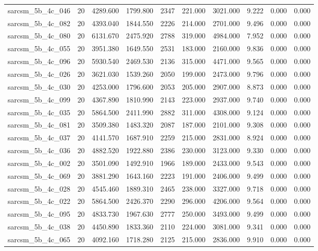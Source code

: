 \begin{tabular}{lrrrrrrrrr}
sarcsm\_5b\_4c\_046 & 20 & 4289.600 & 1799.800 & 2347 & 221.000 & 3021.000 & 9.222 & 0.000 & 0.000 \\
sarcsm\_5b\_4c\_082 & 20 & 4393.040 & 1844.550 & 2226 & 214.000 & 2701.000 & 9.496 & 0.000 & 0.000 \\
sarcsm\_5b\_4c\_080 & 20 & 6131.670 & 2475.920 & 2788 & 319.000 & 4984.000 & 7.952 & 0.000 & 0.000 \\
sarcsm\_5b\_4c\_055 & 20 & 3951.380 & 1649.550 & 2531 & 183.000 & 2160.000 & 9.836 & 0.000 & 0.000 \\
sarcsm\_5b\_4c\_096 & 20 & 5930.540 & 2469.530 & 2136 & 315.000 & 4471.000 & 9.565 & 0.000 & 0.000 \\
sarcsm\_5b\_4c\_026 & 20 & 3621.030 & 1539.260 & 2050 & 199.000 & 2473.000 & 9.796 & 0.000 & 0.000 \\
sarcsm\_5b\_4c\_030 & 20 & 4253.000 & 1796.600 & 2053 & 205.000 & 2907.000 & 8.873 & 0.000 & 0.000 \\
sarcsm\_5b\_4c\_099 & 20 & 4367.890 & 1810.990 & 2143 & 223.000 & 2937.000 & 9.740 & 0.000 & 0.000 \\
sarcsm\_5b\_4c\_035 & 20 & 5864.500 & 2411.990 & 2882 & 311.000 & 4308.000 & 9.124 & 0.000 & 0.000 \\
sarcsm\_5b\_4c\_081 & 20 & 3509.380 & 1483.320 & 2087 & 187.000 & 2101.000 & 9.308 & 0.000 & 0.000 \\
sarcsm\_5b\_4c\_037 & 20 & 4141.570 & 1687.910 & 2259 & 215.000 & 2831.000 & 8.924 & 0.000 & 0.000 \\
sarcsm\_5b\_4c\_036 & 20 & 4882.520 & 1922.880 & 2386 & 230.000 & 3123.000 & 9.330 & 0.000 & 0.000 \\
sarcsm\_5b\_4c\_002 & 20 & 3501.090 & 1492.910 & 1966 & 189.000 & 2433.000 & 9.543 & 0.000 & 0.000 \\
sarcsm\_5b\_4c\_069 & 20 & 3881.290 & 1643.160 & 2223 & 191.000 & 2406.000 & 9.499 & 0.000 & 0.000 \\
sarcsm\_5b\_4c\_028 & 20 & 4545.460 & 1889.310 & 2465 & 238.000 & 3327.000 & 9.718 & 0.000 & 0.000 \\
sarcsm\_5b\_4c\_022 & 20 & 5864.500 & 2426.370 & 2290 & 296.000 & 4206.000 & 9.564 & 0.000 & 0.000 \\
sarcsm\_5b\_4c\_095 & 20 & 4833.730 & 1967.630 & 2777 & 250.000 & 3493.000 & 9.499 & 0.000 & 0.000 \\
sarcsm\_5b\_4c\_038 & 20 & 4450.890 & 1833.360 & 2110 & 224.000 & 3081.000 & 9.341 & 0.000 & 0.000 \\
sarcsm\_5b\_4c\_065 & 20 & 4092.160 & 1718.280 & 2125 & 215.000 & 2836.000 & 9.910 & 0.000 & 0.000 \\

\end{tabular}
